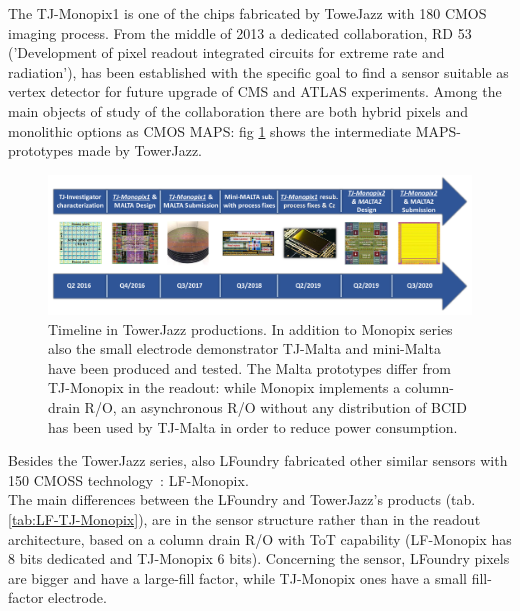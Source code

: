 The TJ-Monopix1 is one of the chips fabricated by ToweJazz with 180 CMOS imaging process. From the middle of 2013 a dedicated collaboration, RD 53 ('Development of pixel readout integrated circuits for extreme rate and radiation'), has been established with the specific goal to find a sensor suitable as vertex detector for future upgrade of CMS and ATLAS experiments. Among the main objects of study of the collaboration there are both hybrid pixels and monolithic options as CMOS MAPS: fig \ref{fig:TJ180nm} shows the intermediate MAPS-prototypes made by TowerJazz.\\
\begin{figure}[h!]
    \centering
    \includegraphics[width=.95\linewidth]{figures/Monopix1/TJ180nm.png}
    \caption{Timeline in TowerJazz productions.  In addition to Monopix series also the small electrode demonstrator TJ-Malta and mini-Malta have been produced and tested\cite{MALTA}. The Malta prototypes differ from TJ-Monopix in the readout: while Monopix implements a column-drain R/O, an asynchronous R/O without any distribution of BCID has been used by TJ-Malta in order to reduce power consumption.}
    \label{fig:TJ180nm}
\end{figure} 
Besides the TowerJazz series, also LFoundry fabricated other similar sensors with 150 CMOSS technology~\cite{LF-Monopix}\cite{LF-TJ-Monopix}: LF-Monopix.\\
The main differences between the LFoundry and TowerJazz's products (tab. \ref{tab:LF-TJ-Monopix}), are in the sensor structure rather than in the readout architecture, based on a column drain R/O with ToT capability (LF-Monopix has 8 bits dedicated and TJ-Monopix 6 bits). Concerning the sensor, LFoundry pixels are bigger and have a large-fill factor, while TJ-Monopix ones have a small fill-factor electrode.

